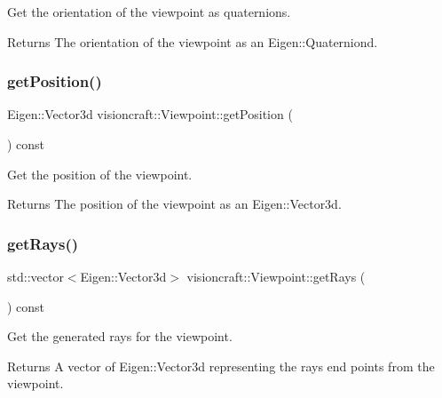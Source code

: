 Get the orientation of the viewpoint as quaternions. 

\begin{DoxyReturn}{Returns}
The orientation of the viewpoint as an Eigen\+::\+Quaterniond. 
\end{DoxyReturn}
\mbox{\label{classvisioncraft_1_1Viewpoint_a2ee8f324a3ff2f1116d6782a20c042ce}} 
\subsubsection{\texorpdfstring{get\+Position()}{getPosition()}}
{\footnotesize\ttfamily Eigen\+::\+Vector3d visioncraft\+::\+Viewpoint\+::get\+Position (\begin{DoxyParamCaption}{ }\end{DoxyParamCaption}) const}



Get the position of the viewpoint. 

\begin{DoxyReturn}{Returns}
The position of the viewpoint as an Eigen\+::\+Vector3d. 
\end{DoxyReturn}
\mbox{\label{classvisioncraft_1_1Viewpoint_a92bbbaf4c8071bce5e6bc5af99500886}} 
\subsubsection{\texorpdfstring{get\+Rays()}{getRays()}}
{\footnotesize\ttfamily std\+::vector$<$Eigen\+::\+Vector3d$>$ visioncraft\+::\+Viewpoint\+::get\+Rays (\begin{DoxyParamCaption}{ }\end{DoxyParamCaption}) const\hspace{0.3cm}{\ttfamily [inline]}}



Get the generated rays for the viewpoint. 

\begin{DoxyReturn}{Returns}
A vector of Eigen\+::\+Vector3d representing the rays\textquotesingle{} end points from the viewpoint. 
\end{DoxyReturn}
\mbox{\label{classvisioncraft_1_1Viewpoint_a82c0a78cac09e12c5df31a77fe930055}} 
